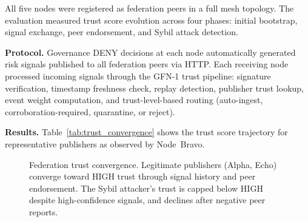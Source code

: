 \documentclass[journal]{IEEEtran}
\begin{document}
All five nodes were registered as federation peers in a full mesh topology. The evaluation measured trust score evolution across four phases: initial bootstrap, signal exchange, peer endorsement, and Sybil attack detection.

\textbf{Protocol.} Governance DENY decisions at each node automatically generated risk signals published to all federation peers via HTTP. Each receiving node processed incoming signals through the GFN-1 trust pipeline: signature verification, timestamp freshness check, replay detection, publisher trust lookup, event weight computation, and trust-level-based routing (auto-ingest, corroboration-required, quarantine, or reject).

\textbf{Results.} Table~\ref{tab:trust_convergence} shows the trust score trajectory for representative publishers as observed by Node~Bravo.

\begin{figure}[t]
\centering
{}
\caption{Federation trust convergence. Legitimate publishers (Alpha, Echo) converge toward HIGH trust through signal history and peer endorsement. The Sybil attacker's trust is capped below HIGH despite high-confidence signals, and declines after negative peer reports.}
\label{fig:trust}
\end{figure}
\end{document}
